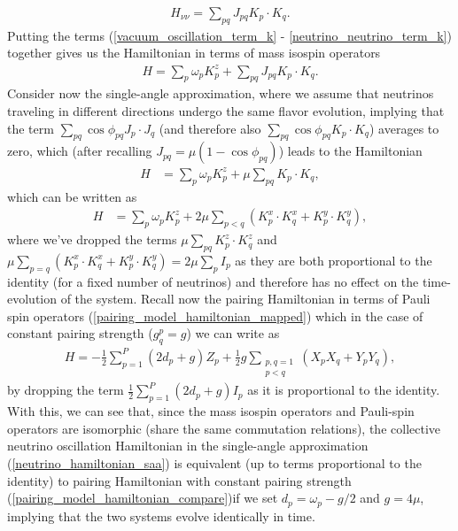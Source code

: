 \documentclass[10pt]{article}
\begin{document}
\begin{align}
\label{neutrino_neutrino_term_k}
H_{\nu\nu}=\sum_{pq}J_{pq}K_p\cdot K_q
.\end{align}
Putting the terms (\ref{vacuum_oscillation_term_k} - \ref{neutrino_neutrino_term_k}) together gives us the Hamiltonian in terms of mass isospin operators
\begin{align}
H=\sum_p\omega_pK^z_p+\sum_{pq}J_{pq}K_p\cdot K_q
.\end{align}
Consider now the single-angle approximation, where we assume that neutrinos traveling in different directions undergo the same flavor evolution, implying that the term $\sum_{pq}\cos\phi_{pq}J_p\cdot J_q$ (and therefore also $\sum_{pq}\cos\phi_{pq}K_p\cdot K_q$) averages to zero, which (after recalling $J_{pq}=\mu(1-\cos\phi_{pq})$) leads to the Hamiltonian
\begin{align}
H
&=
\sum_p\omega_pK^z_p+\mu\sum_{pq}K_p\cdot K_q
,\end{align}
which can be written as
\begin{align}
\label{neutrino_hamiltonian_saa}
H
&=
\sum_p\omega_pK^z_p+2\mu\sum_{p<q}(K^x_p\cdot K^x_q+K^y_p\cdot K^y_q)
,\end{align}
where we've dropped the terms $\mu\sum_{pq}K^z_p\cdot K^z_q$ and $\mu\sum_{p=q}(K^x_p\cdot K^x_q+K^y_p\cdot K^y_q)=2\mu\sum_{p}I_p$ as they are both proportional to the identity (for a fixed number of neutrinos) and therefore has no effect on the time-evolution of the system. Recall now the pairing Hamiltonian in terms of Pauli spin operators (\ref{pairing_model_hamiltonian_mapped}) which in the case of constant pairing strength ($g^p_q=g$) we can write as 
\begin{align}
\label{pairing_model_hamiltonian_compare}
H
=
-\frac{1}{2}\sum_{p=1}^P(2d_p+g)Z_p
+
\frac{1}{2}g\sum_{\substack{p,q=1 \\ p<q}}(X_pX_q+Y_pY_q)
,\end{align}
by dropping the term $\frac{1}{2}\sum_{p=1}^P(2d_p+g)I_p$ as it is proportional to the identity. With this, we can see that, since the mass isospin operators and Pauli-spin operators are isomorphic (share the same commutation relations), the collective neutrino oscillation Hamiltonian in the single-angle approximation (\ref{neutrino_hamiltonian_saa}) is equivalent (up to terms proportional to the identity) to pairing Hamiltonian with constant pairing strength (\ref{pairing_model_hamiltonian_compare})if we set $d_p=\omega_p-g/2$ and $g=4\mu$, implying that the two systems evolve identically in time.
\end{document}
